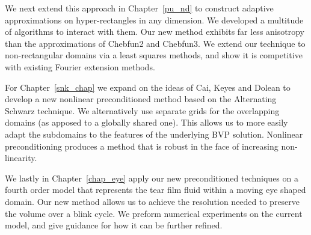  We next extend this approach in Chapter~\ref{pu_nd} to construct adaptive approximations on hyper-rectangles in any dimension. We developed a multitude of algorithms to interact with them. Our new method exhibits far less anisotropy than the approximations of Chebfun2 and Chebfun3. We extend our technique to non-rectangular domains via a least squares methods, and show it is competitive with existing Fourier extension methods.
 
 For Chapter~\ref{snk_chap} we expand on the ideas of Cai, Keyes and Dolean to develop a new nonlinear preconditioned method based on the Alternating Schwarz technique. We alternatively use separate grids for the overlapping domains (as apposed to a globally shared one). This allows us to more easily adapt the subdomains to the features of the underlying BVP solution. Nonlinear preconditioning produces a method that is robust in the face of increasing non-linearity.
 
  We lastly in Chapter~\ref{chap_eye} apply our new preconditioned techniques on a fourth order model that represents the tear film fluid within a moving eye shaped domain. Our new method allows us to achieve the resolution needed to preserve the volume over a blink cycle. We preform numerical experiments on the current model, and give guidance for how it can be further refined.

